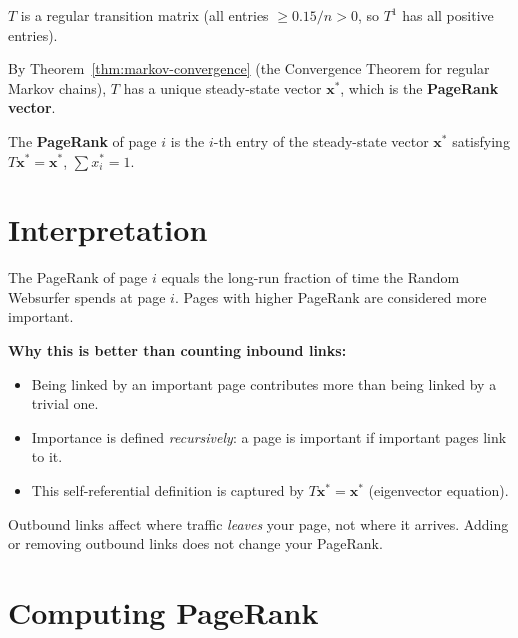 \begin{theorem}
$T$ is a regular transition matrix (all entries $\geq 0.15/n>0$, so $T^1$ has all positive entries).
\end{theorem}

By Theorem~\ref{thm:markov-convergence} (the Convergence Theorem for regular Markov chains), $T$ has a unique steady-state vector $\mathbf{x}^*$, which is the \textbf{PageRank vector}.

\begin{definition}[PageRank]
The \textbf{PageRank} of page $i$ is the $i$-th entry of the steady-state vector $\mathbf{x}^*$ satisfying $T\mathbf{x}^*=\mathbf{x}^*$, $\sum x_i^*=1$.
\end{definition}

\section{Interpretation}

The PageRank of page $i$ equals the long-run fraction of time the Random Websurfer spends at page $i$. Pages with higher PageRank are considered more important.

\textbf{Why this is better than counting inbound links:}
\begin{itemize}
  \item Being linked by an important page contributes more than being linked by a trivial one.
  \item Importance is defined \textit{recursively}: a page is important if important pages link to it.
  \item This self-referential definition is captured by $T\mathbf{x}^*=\mathbf{x}^*$ (eigenvector equation).
\end{itemize}

\begin{remark}
Outbound links affect where traffic \emph{leaves} your page, not where it arrives. Adding or removing outbound links does not change your PageRank.
\end{remark}

\section{Computing PageRank}

